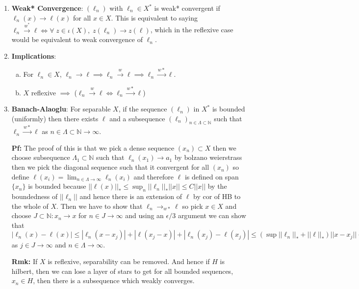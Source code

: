 \documentclass{article}
\begin{document}
\begin{enumerate}
    \item \textbf{Weak* Convergence}: \((\ell_n)\) with \(\ell_n \in X^*\) is weak* convergent if \(\ell_n(x) \to \ell(x)\) for all \(x \in X\). This is equivalent to saying \(\ell_n \overset{w^*}{\to} \ell \iff \forall\; z \in \iota(X), \;z(\ell_n) \to z(\ell)\), which in the reflexive case would be equivalent to weak convergence of \(\ell_n\).

    \item \textbf{Implications}:
    \begin{enumerate} [a.]
        \item For \(\ell_n \in X\), \(\ell_n \to \ell \implies \ell_n \overset{w}{\to} \ell \implies \ell_n \overset{w*}{\to} \ell \). 
        \item \(X\) reflexive \(\implies\) (\(\ell_n \overset{w}{\to} \ell \iff \ell_n \overset{w*}{\to} \ell\))
    \end{enumerate}

    \item \textbf{Banach-Alaoglu}: For separable \(X\), if the sequence \((\ell_n)\) in \(X^*\) is bounded (uniformly) then there exists \(\ell\) and a subsequence \((\ell_n)_{n \in \Lambda \subset \mathbb{N}}\) such that \(\ell_n \overset{w*}{\to} \ell \) as \(n \in \Lambda \subset \mathbb{N} \to \infty\).

    \textbf{Pf:} The proof of this is that we pick a dense sequence \((x_n)\subset X\) then we choose subsequence \(\Lambda_1 \subset \mathbb{N}\) such that \(\ell_n(x_1) \to a_1\) by bolzano weierstrass then we pick the diagonal sequence such that it convergent for all \((x_n)\) so define \(\ell(x_i) = \lim_{n \in \Lambda \to \infty} \ell_n(x_i)\) and therefore \(\ell\) is defined on span\(\{x_n\}\) is bounded because \(||\ell(x)||_* \leq \sup_n||\ell_n||_*||x|| \leq C||x||\) by the boundedness of \(||\ell_n||\) and hence there is an extension of \(\ell\) by cor of HB to the whole of \(X\). Then we have to show that \(\ell_n \to_{w*} \ell \) so pick \(x \in X\) and choose \(J\subset \mathbb{N}:x_n \to x\) for \(n \in J \to \infty\) and using an \(\epsilon /3\) argument we can show that \(|\ell_n(x) - \ell(x)| \leq |\ell_n(x-x_j)| + |\ell(x_j - x)| + |\ell_n(x_j)- \ell(x_j)|\leq (\sup||\ell_n||_* + ||\ell||_*)||x-x_j|| + |\ell_n(x_j)- \ell(x_j)| \to 0\) as \(j \in J \to \infty\) and \(n \in \Lambda \to \infty\). 

    \textbf{Rmk:} If \(X\) is reflexive, separability can be removed. And hence if \(H\) is hilbert, then we can lose a layer of stars to get for all bounded sequences, \(x_n \in H\), then there is a subsequence which weakly converges.


\end{enumerate}
\end{document}
